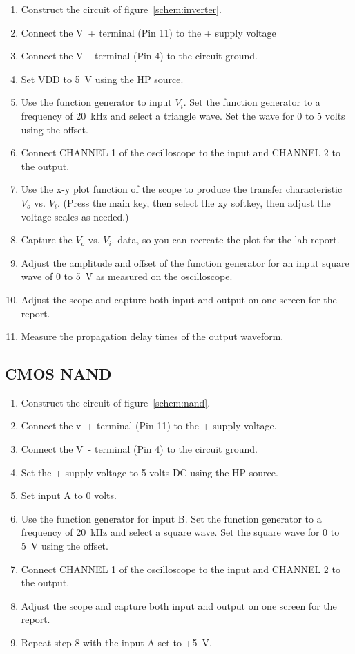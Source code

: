 \begin{enumerate}
\item Construct the circuit of figure~\ref{schem:inverter}.
\item Connect the \si{V+} terminal (Pin 11) to the + supply voltage
\item Connect the \si{V-} terminal (Pin 4) to the circuit ground.
\item Set VDD to \SI{5}{V} using the HP source.
\item Use the function generator to input $V_i$. Set the function generator to a frequency of \SI{20}{kHz} and select a triangle wave. Set the wave for 0 to 5 volts using the offset.
\item Connect CHANNEL 1 of the oscilloscope to the input and CHANNEL 2 to the output.
\item Use the x-y plot function of the scope to produce the transfer characteristic $V_o$ vs. $V_i$. (Press the main key, then select the xy softkey, then adjust the voltage scales as needed.)
\item Capture the $V_o$ vs. $V_i$.  data, so you can recreate the plot for the lab report.
\item Adjust the amplitude and offset of the function generator for an input square wave of 0 to \SI{5}{V} as measured on the oscilloscope.
\item Adjust the scope and capture both input and output on one screen for the report.
\item Measure the propagation delay times of the output waveform.
\end{enumerate}

\subsection{CMOS NAND}
\label{sec:nand}

\begin{enumerate}
\item Construct the circuit of figure~\ref{schem:nand}.
\item Connect the \si{v+} terminal (Pin 11) to the + supply voltage.
\item Connect the \si{V-} terminal (Pin 4) to the circuit ground.
\item Set the + supply voltage to 5 volts DC using the HP source.
\item Set input A to 0 volts.
\item Use the function generator for input B. Set the function generator to a frequency of \SI{20}{kHz} and select a square wave. Set the square wave for 0 to \SI{5}{V} using the offset.
\item Connect CHANNEL 1 of the oscilloscope to the input and CHANNEL 2 to the output.
\item Adjust the scope and capture both input and output on one screen for the report.
\item Repeat step 8 with the input A set to +\SI{5}{V}.
\end{enumerate}

